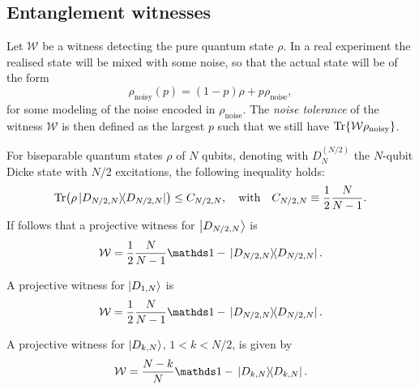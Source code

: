\documentclass[a4paper]{report}
\begin{document}
\subsection{Entanglement witnesses}

\begin{defn}
	Let $\mathcal W$ be a witness detecting the pure quantum state $\rho$.
	In a real experiment the realised state will be mixed with some noise, so that the actual state will be of the form
	\begin{equation}
		\rho_{\text{noisy}}(p) = (1-p) \rho + p \rho_{\text{noise}},
	\end{equation}
	for some modeling of the noise encoded in $\rho_{\text{noise}}$.
	The \emph{noise tolerance} of the witness $\mathcal W$ is then defined as the largest $p$ such that we still have $\Tr{\mathcal W \rho_{\text{noisy}}}$.
\end{defn}

\begin{thm}
	
\end{thm}

\begin{thm}
	For biseparable quantum states $\rho$ of $N$ qubits,
	denoting with $D_N^{(N/2)}$ the $N$-qubit Dicke state with $N/2$ excitations,
	the following inequality holds:
	\begin{equation}
		\Tr(\rho \ketbra*{D_{N/2,N}}{D_{N/2,N}})
		\le C_{N/2, N},
		\quad\text{with}\quad
		C_{N/2,N} \equiv \frac{1}{2}\frac{N}{N-1}.
	\end{equation}
	If follows that a projective witness for $\ket{D_{N/2,N}}$ is
	\begin{equation}
		\mathcal W = \frac{1}{2} \frac{N}{N - 1} \mathds 1 -
			\ketbra*{D_{N/2,N}}{D_{N/2,N}}.
	\end{equation}
\end{thm}

\begin{thm}
	A projective witness for $\ket{D_{1, N}}$ is
	\begin{equation}
		\mathcal W = \frac{1}{2} \frac{N}{N - 1} \mathds 1 -
			\ketbra*{D_{N/2,N}}{D_{N/2,N}}.
	\end{equation}
\end{thm}

\begin{thm}
	A projective witness for $\ket{D_{k, N}}$, $1 < k < N/2$, is given by
	\begin{equation}
		\mathcal W = \frac{N - k}{N} \mathds 1 - \ketbra*{D_{k,N}}{D_{k,N}}.
	\end{equation}
\end{thm}
\end{document}
